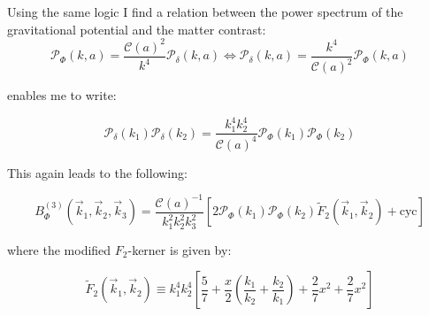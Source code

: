             Using the same logic I find a relation between the power spectrum of the gravitational potential and the matter contrast:
            \begin{equation}
                \mathcal{P}_\Phi(k,a) = \frac{\mathcal{C}(a)^2}{k^4} \mathcal{P}_\delta(k,a) \Longleftrightarrow \mathcal{P}_\delta(k,a) = \frac{k^4}{\mathcal{C}(a)^2} \mathcal{P}_\Phi(k,a)
            \end{equation}

            enables me to write:

            \begin{equation}
                \mathcal{P}_\delta(k_1)\mathcal{P}_\delta(k_2) = \frac{k_1^4k_2^4}{\mathcal{C}(a)^4} \mathcal{P}_\Phi(k_1)\mathcal{P}_\Phi(k_2)
            \end{equation}

            This again leads to the following:

            \begin{equation}
                B^{(3)}_\Phi(\vec{k}_1,\vec{k}_2,\vec{k}_3) = \frac{\mathcal{C}(a)^{-1}}{k_1^2k_2^2k_3^2} \left[2\mathcal{P}_\Phi(k_1)\mathcal{P}_\Phi(k_2)\tilde{F}_2(\vec{k}_1, \vec{k}_2) + \mathrm{cyc}\right]
            \end{equation}

            where the modified $F_2$-kerner is given by:

            \begin{equation}
                \tilde{F}_2(\vec{k}_1, \vec{k}_2) \equiv k_1^4k_2^4\left[\frac{5}{7} + \frac{x}{2}\left(\frac{k_1}{k_2}+\frac{k_2}{k_1}\right) + \frac{2}{7}x^2 + \frac{2}{7}x^2\right]
            \end{equation}





